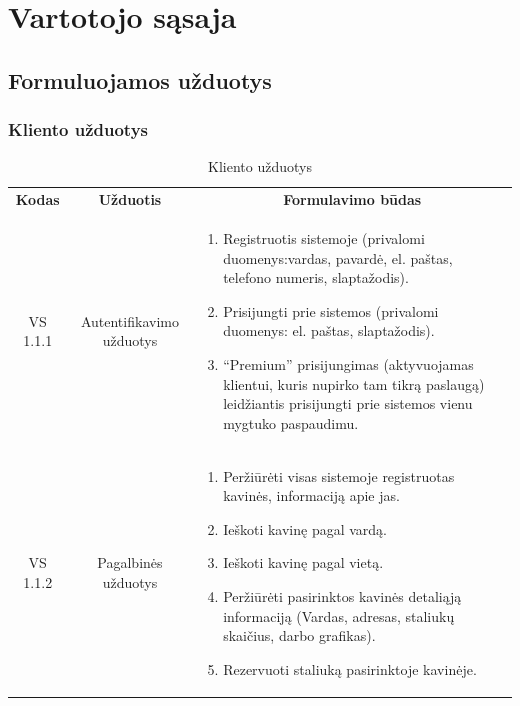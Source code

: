 \documentclass{VUMIFPSkursinis}
\begin{document}

\section{Vartotojo sąsaja}

\subsection{Formuluojamos užduotys}
\subsubsection{Kliento užduotys}
\begin{center}
	\begin{table}[H]
	\caption{Kliento užduotys}
	\begin{tabular}{|p{2cm}|p{}|p{}|}
	\hline
	    \rowcolor{lightgray}
		\multicolumn{3}{|c|}{Kliento užduotys}\\
		
	\hline
		\multicolumn{1}{|c|}{{\bfseries Kodas}}&
		\multicolumn{1}{|c|}{{\bfseries Užduotis}}&
		\multicolumn{1}{|c|}{{\bfseries Formulavimo būdas}}\\		
	\hline
		\multicolumn{1}{|c|}{VS 1.1.1}& 	
		\multicolumn{1}{|c|}{Autentifikavimo užduotys}&
		{
			\begin{enumerate}
				\item Registruotis sistemoje
				(privalomi duomenys:vardas, pavardė, el. paštas, telefono numeris, slaptažodis).
				\item Prisijungti prie sistemos (privalomi duomenys: el. paštas, slaptažodis).
				\item “Premium” prisijungimas (aktyvuojamas klientui, kuris nupirko tam tikrą paslaugą) leidžiantis prisijungti prie sistemos vienu mygtuko paspaudimu.
			\end{enumerate}}\\
	
	\hline
		\multicolumn{1}{|c|}{VS 1.1.2}&  	
		\multicolumn{1}{|c|}{Pagalbinės užduotys}&
		{
			\begin{enumerate}
				\item Peržiūrėti visas sistemoje registruotas kavinės, informaciją apie jas.
				\item Ieškoti kavinę pagal vardą.
				\item Ieškoti kavinę pagal vietą.
				\item Peržiūrėti pasirinktos kavinės detaliąją informaciją (Vardas, adresas, staliukų skaičius, darbo grafikas).
				\item Rezervuoti staliuką pasirinktoje kavinėje.
			\end{enumerate}}\\
	
	\hline 	 	
	\end{tabular}

	\label{table:1}
	\end{table}

\end{center}
\end{document}
